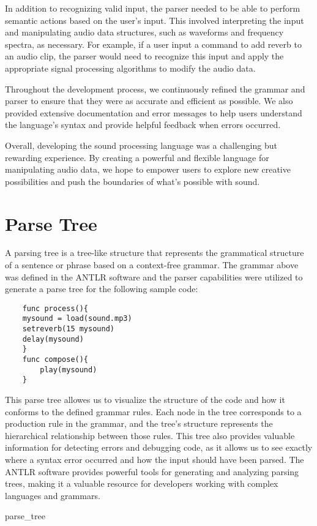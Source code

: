 In addition to recognizing valid input, the parser needed to be able to perform semantic actions based on the user's input. This involved interpreting the input and manipulating audio data structures, such as waveforms and frequency spectra, as necessary. For example, if a user input a command to add reverb to an audio clip, the parser would need to recognize this input and apply the appropriate signal processing algorithms to modify the audio data.

Throughout the development process, we continuously refined the grammar and parser to ensure that they were as accurate and efficient as possible. We also provided extensive documentation and error messages to help users understand the language's syntax and provide helpful feedback when errors occurred.

Overall, developing the sound processing language was a challenging but rewarding experience. By creating a powerful and flexible language for manipulating audio data, we hope to empower users to explore new creative possibilities and push the boundaries of what's possible with sound.

\section{Parse Tree}
A parsing tree is a tree-like structure that represents the grammatical structure of a sentence or phrase based on a context-free grammar. 
The grammar above was defined in the ANTLR software and the parser capabilities were utilized to generate a parse tree for the following sample code:
\begin{verbatim} 
    func process(){
    mysound = load(sound.mp3)
    setreverb(15 mysound)
    delay(mysound)
    }
    func compose(){
    	play(mysound)
    }
\end{verbatim}

This parse tree allowes us to visualize the structure of the code and how it conforms to the defined grammar rules. Each node in the tree corresponds to a production rule in the grammar, and the tree's structure represents the hierarchical relationship between those rules. This tree also provides valuable information for detecting errors and debugging code, as it allows us to see exactly where a syntax error occurred and how the input should have been parsed. The ANTLR software provides powerful tools for generating and analyzing parsing trees, making it a valuable resource for developers working with complex languages and grammars.

{parse_tree}